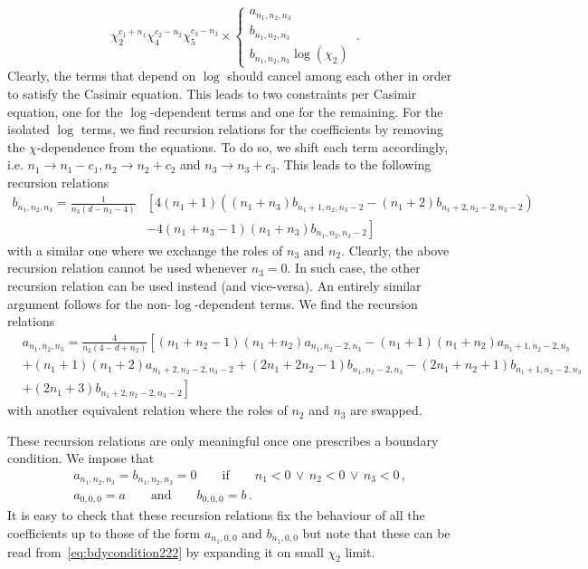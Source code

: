 \begin{equation}
  \chi_2^{c_1+n_1}\chi_4^{c_2-n_2} \chi_5^{c_3-n_3}\times\begin{cases}a_{n_1,n_2,n_3} \\
    b_{n_1,n_2,n_3} \\
    b_{n_1,n_2,n_3}\log(\chi_2)\end{cases}\,.
\end{equation}
Clearly, the terms that depend on $\log$ should cancel among each other in order to satisfy the Casimir equation. This leads to two constraints per Casimir equation, one for the $\log$-dependent terms and one for the remaining. For the isolated $\log$ terms, we find recursion relations for the coefficients by removing the $\chi$-dependence from the equations. To do so, we shift each term accordingly, i.e. $n_1 \to n_1-c_1, n_2 \to n_2+c_2$ and $n_3 \to n_3+ c_3$. This leads to the following recursion relations
\begin{align}
  b_{n_1,n_2,n_3}= \frac{1}{n_3 (d-n_3-4)} & \left[ 4 (n_1+1) \left((n_1+n_3)
    b_{n_1+1,n_2,n_3-2}-(n_1+2)
  b_{n_1+2,n_2-2,n_3-2}\right)\right.\nonumber                                \\
                                           & \left. -4 (n_1+n_3-1) (n_1+n_3)
    b_{n_1,n_2,n_3-2}\right]
\end{align}
with a similar one where we exchange the roles of $n_3$ and $n_2$. Clearly, the above recursion relation cannot be used whenever $n_3=0$. In such case, the other recursion relation can be used instead (and vice-versa). An entirely similar argument follows for the non-$\log$-dependent terms. We find the recursion relations
\begin{align}
   & a_{n_1,n_2,n_3}= \frac{4}{n_2 (4-d+n_2)}\left[(n_1+n_2-1) (n_1+n_2)
    a_{n_1,n_2-2,n_3}-(n_1+1) (n_1+n_2)
  a_{n_1+1,n_2-2,n_3}\right.\nonumber                                    \\
   & \left.+(n_1+1) (n_1+2)
    a_{n_1+2,n_2-2,n_3-2}+(2 n_1+2 n_2-1)
    b_{n_1,n_2-2,n_3}-(2 n_1+n_2+1)
  b_{n_1+1,n_2-2,n_3}\right.\nonumber                                    \\
   & \left.+(2 n_1+3)
    b_{n_1+2,n_2-2,n_3-2}\right]
\end{align}
with another equivalent relation where the roles of $n_2$ and $n_3$ are swapped.

These recursion relations are only meaningful once one prescribes a boundary condition. We impose that
\begin{align}
   & a_{n_1,n_2,n_3}=b_{n_1,n_2,n_3}=0\qquad \text{if} \qquad n_1<0\, \lor\, n_2<0\, \lor\, n_3<0\,,\nonumber \\
   & a_{0,0,0}= a \qquad \text{and} \qquad b_{0,0,0}=b\,.
\end{align}
It is easy to check that these recursion relations fix the behaviour of all the coefficients up to those of the form $a_{n_1,0,0}$ and $b_{n_1,0,0}$ but note that these can be read from~\eqref{eq:bdycondition222} by expanding it on small $\chi_2$ limit.

